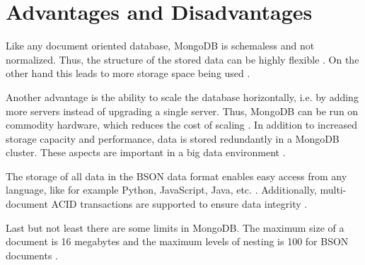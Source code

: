 
\section{Advantages and Disadvantages}
Like any document oriented database, MongoDB is schemaless and not normalized. Thus, the structure of the stored data can
be highly flexible \parencite{Mongo-Advantages}. On the other hand this leads to more storage space being used \parencite[p. 2]{Cottrell2020}. 

Another advantage is the ability to scale the database horizontally, i.e. by adding more servers instead of upgrading a single server. 
Thus, MongoDB can be run on commodity hardware, which reduces the cost of scaling \parencites[p. 1]{Cottrell2020}{Mongo-Sharding}.
In addition to increased storage capacity and performance, data is stored redundantly in a MongoDB cluster. These aspects are important 
in a big data environment \parencite{Mongo-Advantages}.

The storage of all data in the BSON data format enables easy access from any language, like for example Python, JavaScript, Java, etc. \parencite{Mongo-Advantages}.
Additionally, multi-document ACID transactions are supported to ensure data integrity \parencite{Mongo-ACID}.

Last but not least there are some limits in MongoDB. The maximum size of a document is 16 megabytes
and the maximum levels of nesting is 100 for BSON documents \parencite{Mongo-Limits}.
